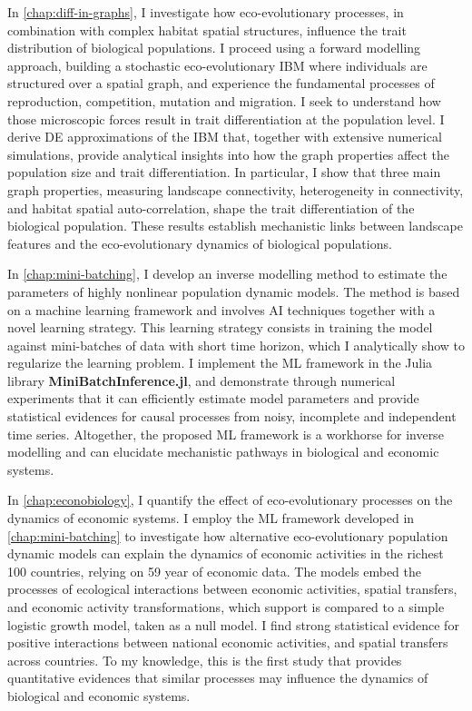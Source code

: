 In \cref{chap:diff-in-graphs}, I investigate how eco-evolutionary processes, in combination with complex habitat spatial structures, influence the trait distribution of biological populations. 
I proceed using a forward modelling approach, building a stochastic eco-evolutionary IBM where individuals are structured over a spatial graph, and experience the fundamental processes of reproduction, competition, mutation and migration. I seek to understand how those microscopic forces result in trait differentiation at the population level. I derive DE approximations of the IBM that, together with extensive numerical simulations, provide analytical insights into how the graph properties affect the population size and trait differentiation. In particular, I show that three main graph properties, measuring landscape connectivity, heterogeneity in connectivity, and habitat spatial auto-correlation, shape the trait differentiation of the biological population. These results establish mechanistic links between landscape features and the eco-evolutionary dynamics of biological populations.

In \cref{chap:mini-batching}, I develop an inverse modelling method to estimate the parameters of highly nonlinear population dynamic models. The method is based on a machine learning framework and involves AI techniques together with a novel learning strategy. This learning strategy consists in training the model against mini-batches of data with short time horizon, which I analytically show to regularize the learning problem. I implement the ML framework in the Julia library \textbf{MiniBatchInference.jl}, and demonstrate through numerical experiments that it can efficiently estimate model parameters and provide statistical evidences for causal processes from noisy, incomplete and independent time series. Altogether, the proposed ML framework is a workhorse for inverse modelling and can elucidate mechanistic pathways in biological and economic systems.

In \cref{chap:econobiology}, I quantify the effect of eco-evolutionary processes on the dynamics of economic systems. I employ the ML framework developed in \cref{chap:mini-batching} to investigate how alternative eco-evolutionary population dynamic models can explain the dynamics of economic activities in the richest 100 countries, relying on 59 year of economic data. The models embed the processes of ecological interactions between economic activities, spatial transfers, and economic activity transformations, which support is compared to a simple logistic growth model, taken as a null model. I find strong statistical evidence for positive interactions between national economic activities, and spatial transfers across countries. To my knowledge, this is the first study that provides quantitative evidences that similar processes may influence the dynamics of biological and economic systems.

